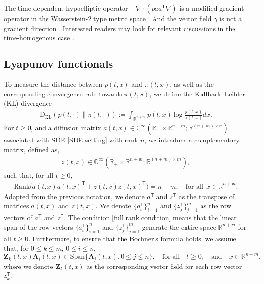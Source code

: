 \documentclass[11pt,reqno]{amsart}
\newcommand{\ts}{\mathsf{T}}
\newcommand{\bea}{\begin{eqnarray}}
\newcommand{\eea}{\end{eqnarray}}
\def\hR{\mathbb{R}}
\newcommand{\kl}{\mathrm D_{\mathrm{KL}}}
\begin{document}
\begin{remark}
The time-dependent hypoelliptic operator $-\nabla\cdot(p aa^{\ts}\nabla)$ is a modified gradient operator in the Wasserstein-2 type metric space \cite{Villani2009_optimal}. And the vector field $\gamma$ is not a gradient direction \cite{Villani2006_hypocoercivity}. Interested readers may look for relevant discussions in the time-homogenous case \cite{FengLi2021}.
\end{remark}

\subsection{Lyapunov functionals}
To measure the distance between $p(t,x)$ and $\pi(t,x)$, as well as the corresponding convergence rate towards $\pi(t,x)$, we define the Kullback–Leibler (KL) divergence
\bea
\kl(p(t,\cdot) \|\pi(t,\cdot)):=\int_{\mathbb R^{n+m}} {p} (t,x)\log \frac{{p} (t,x)}{\pi(t,x )}dx.
\eea
For $t\ge 0$, and a diffusion matrix $a(t,x)\in \mathbb C^{\infty}(\hR_+\times\mathbb{R}^{n+m}; \mathbb{R}^{(n+m)\times n})$ 
associated with SDE \eqref{SDE setting} with rank $n$, we introduce a complementary matrix, defined as, 
\bea\label{defn: z} 
z(t,x)\in \mathbb C^{\infty}(\mathbb R_+\times \mathbb R^{n+m}; \mathbb R^{(n+m)\times m}),
\eea  
such that, for all $t\ge 0$, 
\bea \label{full rank condition}
\text{Rank}\Big(a(t,x)a(t,x)^{\ts}+z(t,x)z(t,x)^{\ts}\Big) =n+m,\quad \text{for all} ~~x\in \hR^{n+m}.
\eea 
Adapted from the previous notation, we denote $a^{\ts}$ and $z^{\ts}$ as the transpose of  matrices $a(t,x)$ and $z(t,x)$. We denote $\{ a^{\ts}_i\}_{i=1}^n$ and $\{ z^{\ts}_j\}_{j=1}^m$ as the row vectors of $a^{\ts}$ and $z^{\ts}$. The condition \eqref{full rank condition} means that the linear span of the row vectors $\{ a^{\ts}_i\}_{i=1}^n$ and $\{ z^{\ts}_j\}_{j=1}^m$ generate the entire space $\hR^{n+m}$ for all $t\ge 0$. Furthermore, to ensure that the Bochner's formula \cite[Theorem 1]{FengLi2021} holds, we assume that, for $0\le k\le m$, $0\le i\le n$, 
\begin{equation}\label{condition: bochner}
    \mathbf Z_k(t,x)\mathbf A_i(t,x)\in \mathrm{Span}\{\mathbf A_j(t,x), 0\le j\le n \},\quad \text{for all}\quad t\ge 0,\quad \text{and}\quad x\in\mathbb R^{n+m},
\end{equation}
where we denote $\mathbf Z_k(t,x)$ as the corresponding vector field for each row vector $z^{\ts}_k$.
\end{document}
